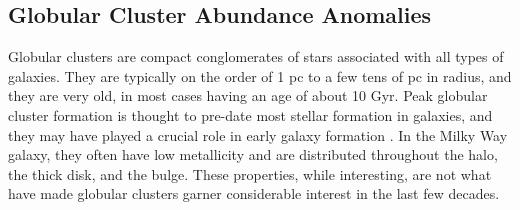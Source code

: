 \subsection{Globular Cluster Abundance Anomalies} \label{subsec:GC_Candidate}




Globular clusters are compact conglomerates of stars associated with all types of galaxies. They are typically on the order of 1 pc to a few tens of pc in radius, and they are very old, in most cases having an age of about 10 Gyr. Peak globular cluster formation is thought to pre-date most stellar formation in galaxies, and they may have played a crucial role in early galaxy formation \cite{Gratton2019}. In the Milky Way galaxy, they often have low metallicity and are distributed throughout the halo, the thick disk, and the bulge. These properties, while interesting, are not what have made globular clusters garner considerable interest in the last few decades.

